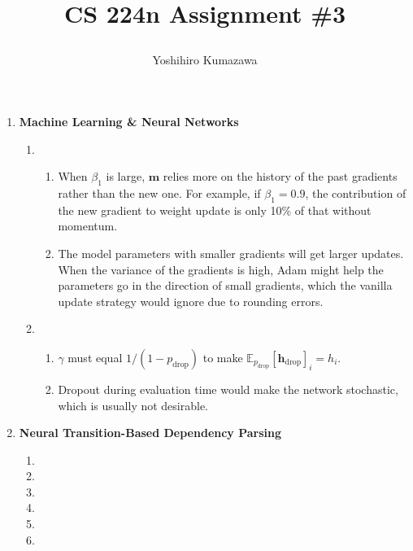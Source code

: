 \documentclass[12pt, dvipdfmx]{article}
\title{
  \vspace{-2cm}
  CS 224n Assignment \#3 \\
  \author{Yoshihiro Kumazawa}
}
\begin{document}
\maketitle
\begin{enumerate}[label=\textbf{\arabic*.}]
\item \textbf{Machine Learning \& Neural Networks}
\begin{enumerate}[label=(\alph*)]
\item
\begin{enumerate}[label=\roman*.]
\item When $\beta_1$ is large, $\bm{m}$ relies more on the history of the past gradients rather than the new one. For example, if $\beta_1=0.9$, the contribution of the new gradient to weight update is only 10\% of that without momentum.
\item The model parameters with smaller gradients will get larger updates. When the variance of the gradients is high, Adam might help the parameters go in the direction of small gradients, which the vanilla update strategy would ignore due to rounding errors.
\end{enumerate}
\item
\begin{enumerate}[label=\roman*.]
\item $\gamma$ must equal $1/(1-p_\mathrm{drop})$ to make $\mathbb{E}_{p_\mathrm{drop}}[\bm{h}_\mathrm{drop}]_i=h_i$.
\item Dropout during evaluation time would make the network stochastic, which is usually not desirable.
\end{enumerate}
\end{enumerate}
\item \textbf{Neural Transition-Based Dependency Parsing}
\begin{enumerate}[label=(\alph*)]
\item
\item
\item
\item
\item
\item
\end{enumerate}
\end{enumerate}
\end{document}
